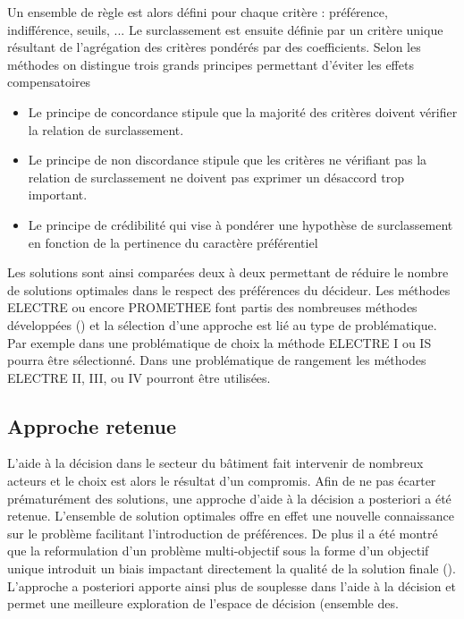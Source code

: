 Un ensemble de règle est alors défini pour chaque critère : préférence, indifférence,
seuils, ... Le surclassement est ensuite définie par un critère unique résultant de
l’agrégation des critères pondérés par des coefficients. Selon les méthodes on distingue
trois grands principes permettant d’éviter les effets compensatoires
\begin{itemize}
  \item Le principe de concordance stipule que la majorité des critères doivent
        vérifier la relation de surclassement.
  \item Le principe de non discordance stipule que les critères ne vérifiant pas
        la relation de surclassement ne doivent pas exprimer un désaccord trop
        important.
  \item Le principe de crédibilité qui vise à pondérer une hypothèse de surclassement
        en fonction de la pertinence du caractère préférentiel
\end{itemize}
Les solutions sont ainsi comparées deux à deux permettant de réduire le nombre de
solutions optimales dans le respect des préférences du décideur.
Les méthodes ELECTRE ou encore PROMETHEE font partis des nombreuses
méthodes développées () et la sélection d’une approche est lié
au type de problématique. Par exemple dans une problématique de choix la méthode
ELECTRE I ou IS pourra être sélectionné. Dans une problématique de rangement les
méthodes ELECTRE II, III, ou IV pourront être utilisées.



\subsection{Approche retenue} %
\label{sub:approche_retenue}
L’aide à la décision dans le secteur du bâtiment fait intervenir de nombreux acteurs
et le choix est alors le résultat d’un compromis. Afin de ne pas écarter prématurément
des solutions, une approche d’aide à la décision a posteriori a été retenue. L’ensemble
de solution optimales offre en effet une nouvelle connaissance sur le problème
facilitant l’introduction de préférences.
De plus il a été montré que la reformulation d’un problème multi-objectif sous la
forme d’un objectif unique introduit un biais impactant directement la qualité de
la solution finale (). L’approche a posteriori
apporte ainsi plus de souplesse dans l’aide à la décision et permet une meilleure
exploration de l’espace de décision (ensemble des.

